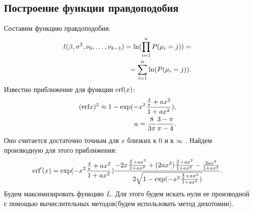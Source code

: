 \documentclass[12pt]{article}
\begin{document}
\subsection{Построение функции правдоподобия}
Составим функцию правдоподобия:
\begin{eqnarray}
    l(\beta,\sigma^2, \nu_0,\dots, \nu_{k-1})=\textup{ln}(\prod_{i=1}^{n}P(\mu_i=j))=\\
    =\sum_{i=1}^{n}\ln(P(\mu_i=j)).
\end{eqnarray}
Известно приближение для функции $\textup{erf}(x)$:
\begin{eqnarray}
    (\textup{erf} x)^2\approx 1- \exp(-x^2 \frac{\frac{4}{\pi}+ax^2}{1+ax^2}),\\
    a=\frac{8}{3\pi}\frac{3-\pi}{\pi -4}.
\end{eqnarray}
Оно считается достаточно точным для $x$ близких к $0$ и к $\infty$ \cite{Winitzki}. \hfill\break
Найдем производную для этого приближения:
\begin{eqnarray}
    \textup{erf}'(x) = \exp(-x^2 \frac{\frac{4}{\pi}+ax^2}{1+ax^2}) \frac{-2x\frac{\frac{4}{\pi}+ax^2}{1+ax^2}+(2ax^3)\frac{\frac{4}{\pi}+ax^2}{1+ax^2}-\frac{2ax^3}{1+ax^2}}{2\sqrt{1- \exp(-x^2 \frac{\frac{4}{\pi}+ax^2}{1+ax^2})}}.
\end{eqnarray}
Будем максимизировать функцию $L$.
Для этого будем искать нули ее производной с помощью вычислительных методов(будем использовать метод дихотомии).
\end{document}
